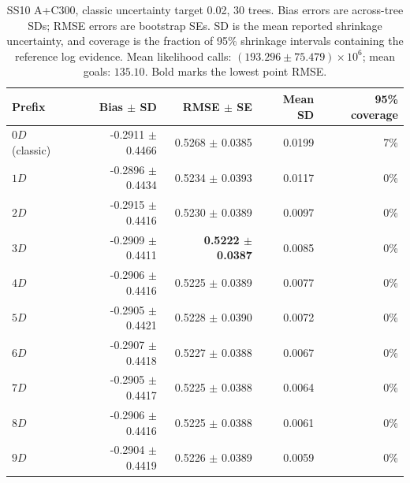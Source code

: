 \begin{table}[t]
\centering
\scriptsize
\caption{SS10 A+C300, classic uncertainty target 0.02, 30 trees. Bias errors are across-tree SDs; RMSE errors are bootstrap SEs. SD is the mean reported shrinkage uncertainty, and coverage is the fraction of 95\% shrinkage intervals containing the reference log evidence. Mean likelihood calls: $(193.296\pm75.479)\times10^6$; mean goals: $135.10$. Bold marks the lowest point RMSE.}
\label{tab:phantom_evidence_ss10_0p02}
\begin{tabular}{lrrrr}
\toprule
Prefix & Bias $\pm$ SD & RMSE $\pm$ SE & Mean SD & 95\% coverage \\
\midrule
$0D$ (classic) & -0.2911 $\pm$ 0.4466 & 0.5268 $\pm$ 0.0385 & 0.0199 & 7\% \\
$1D$ & -0.2896 $\pm$ 0.4434 & 0.5234 $\pm$ 0.0393 & 0.0117 & 0\% \\
$2D$ & -0.2915 $\pm$ 0.4416 & 0.5230 $\pm$ 0.0389 & 0.0097 & 0\% \\
$3D$ & -0.2909 $\pm$ 0.4411 & \textbf{0.5222 $\pm$ 0.0387} & 0.0085 & 0\% \\
$4D$ & -0.2906 $\pm$ 0.4416 & 0.5225 $\pm$ 0.0389 & 0.0077 & 0\% \\
$5D$ & -0.2905 $\pm$ 0.4421 & 0.5228 $\pm$ 0.0390 & 0.0072 & 0\% \\
$6D$ & -0.2907 $\pm$ 0.4418 & 0.5227 $\pm$ 0.0388 & 0.0067 & 0\% \\
$7D$ & -0.2905 $\pm$ 0.4417 & 0.5225 $\pm$ 0.0388 & 0.0064 & 0\% \\
$8D$ & -0.2906 $\pm$ 0.4416 & 0.5225 $\pm$ 0.0388 & 0.0061 & 0\% \\
$9D$ & -0.2904 $\pm$ 0.4419 & 0.5226 $\pm$ 0.0389 & 0.0059 & 0\% \\
\bottomrule
\end{tabular}
\end{table}
